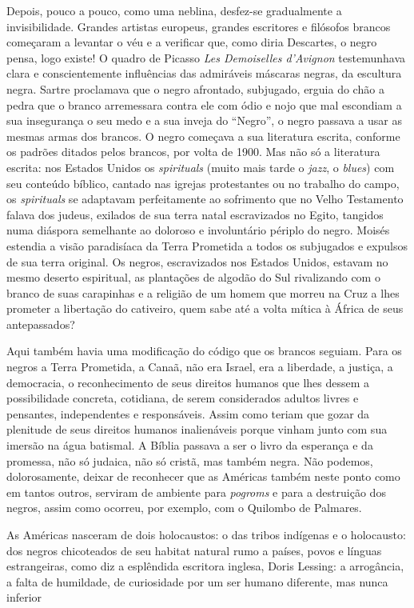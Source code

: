 \documentclass[
  letterpaper,
  DIV=11,
  numbers=noendperiod]{scrreprt}
\begin{document}
Depois, pouco a pouco, como uma neblina, desfez-se gradualmente a
invisibilidade. Grandes artistas europeus, grandes escritores e
filósofos brancos começaram a levantar o véu e a verificar que, como
diria Descartes, o negro pensa, logo existe! O quadro de Picasso
\emph{Les Demoiselles d'Avignon} testemunhava clara e conscientemente
influências das admiráveis máscaras negras, da escultura negra. Sartre
proclamava que o negro afrontado, subjugado, erguia do chão a pedra que
o branco arremessara contra ele com ódio e nojo que mal escondiam a sua
insegurança o seu medo e a sua inveja do ``Negro'', o negro passava a
usar as mesmas armas dos brancos. O negro começava a sua literatura
escrita, conforme os padrões ditados pelos brancos, por volta de 1900.
Mas não só a literatura escrita: nos Estados Unidos os \emph{spirituals}
(muito mais tarde o \emph{jazz}, o \emph{blues}) com seu conteúdo
bíblico, cantado nas igrejas protestantes ou no trabalho do campo, os
\emph{spirituals} se adaptavam perfeitamente ao sofrimento que no Velho
Testamento falava dos judeus, exilados de sua terra natal escravizados
no Egito, tangidos numa diáspora semelhante ao doloroso e involuntário
périplo do negro. Moisés estendia a visão paradisíaca da Terra Prometida
a todos os subjugados e expulsos de sua terra original. Os negros,
escravizados nos Estados Unidos, estavam no mesmo deserto espiritual, as
plantações de algodão do Sul rivalizando com o branco de suas carapinhas
e a religião de um homem que morreu na Cruz a lhes prometer a libertação
do cativeiro, quem sabe até a volta mítica à África de seus
antepassados?

Aqui também havia uma modificação do código que os brancos seguiam. Para
os negros a Terra Prometida, a Canaã, não era Israel, era a liberdade, a
justiça, a democracia, o reconhecimento de seus direitos humanos que
lhes dessem a possibilidade concreta, cotidiana, de serem considerados
adultos livres e pensantes, independentes e responsáveis. Assim como
teriam que gozar da plenitude de seus direitos humanos inalienáveis
porque vinham junto com sua imersão na água batismal. A Bíblia passava a
ser o livro da esperança e da promessa, não só judaica, não só cristã,
mas também negra. Não podemos, dolorosamente, deixar de reconhecer que
as Américas também neste ponto como em tantos outros, serviram de
ambiente para \emph{pogroms} e para a destruição dos negros, assim como
ocorreu, por exemplo, com o Quilombo de Palmares.

As Américas nasceram de dois holocaustos: o das tribos indígenas e o
holocausto: dos negros chicoteados de seu habitat natural rumo a países,
povos e línguas estrangeiras, como diz a esplêndida escritora inglesa,
Doris Lessing: a arrogância, a falta de humildade, de curiosidade por um
ser humano diferente, mas nunca inferior
\end{document}
